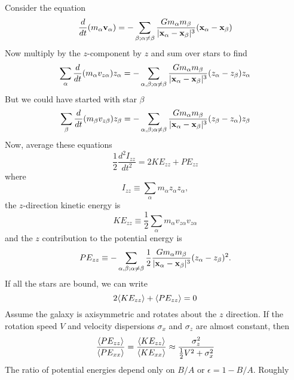 \documentclass[]{article}
\begin{document}
Consider the equation
\begin{equation}
\frac{d}{dt}(m_\alpha \mathbf{v}_\alpha) = - \sum_{\beta; \alpha \ne \beta} \frac{Gm_\alpha m_\beta}{|\mathbf{x}_\alpha - \mathbf{x}_\beta|^3}(\mathbf{x}_\alpha - \mathbf{x}_\beta)
\end{equation}
\noindent
Now multiply by the $z$-component by $z$ and sum over stars to find
\begin{equation}
\sum_{\alpha} \frac{d}{dt}(m_\alpha v_{z\alpha})z_\alpha = - \sum_{\alpha,\beta; \alpha \ne \beta} \frac{Gm_\alpha m_\beta}{|\mathbf{x}_\alpha - \mathbf{x}_\beta|^3}(z_\alpha - z_\beta)z_\alpha
\end{equation}
\noindent
But we could have started with star $\beta$
\begin{equation}
\sum_{\beta} \frac{d}{dt}(m_\beta v_{z\beta})z_\beta = - \sum_{\alpha,\beta; \alpha \ne \beta} \frac{Gm_\alpha m_\beta}{|\mathbf{x}_\alpha - \mathbf{x}_\beta|^3}(z_\beta - z_\alpha)z_\beta
\end{equation}
\noindent
Now, average these equations
\begin{equation}
\frac{1}{2}\frac{d^2 I_{zz}}{dt^2} = 2KE_{zz} + PE_{zz}
\end{equation}
\noindent
where
\begin{equation}
I_{zz} \equiv \sum_{\alpha} m_\alpha z_\alpha z_\alpha,
\end{equation}
\noindent
the $z$-direction kinetic energy is
\begin{equation}
KE_{zz} \equiv \frac{1}{2} \sum_{\alpha} m_{\alpha} v_{z\alpha} v_{z\alpha}
\end{equation}
and the $z$ contribution to the potential energy is
\begin{equation}
PE_{zz} \equiv -\sum_{\alpha,\beta;\alpha\ne\beta}\frac{1}{2} \frac{Gm_\alpha m_\beta}{|\mathbf{x}_\alpha - \mathbf{x}_\beta|^3}(z_\alpha-z_\beta)^2.
\end{equation}
\noindent
If all the stars are bound, we can write
\begin{equation}
2\langle KE_{zz}\rangle + \langle PE_{zz}\rangle = 0
\end{equation}
\noindent
Assume the galaxy is axisymmetric and rotates about the $z$ direction.  If the rotation speed
$V$ and velocity dispersions $\sigma_x$ and $\sigma_z$ are almost constant, then
\begin{equation}
\frac{\langle PE_{zz}\rangle}{\langle PE_{xx}\rangle} = \frac{\langle KE_{zz}\rangle}{\langle KE_{xx}\rangle} \approx \frac{\sigma_z^2}{\frac{1}{2}V^2 + \sigma_x^2}
\end{equation}
\noindent
The ratio of potential energies depend only on $B/A$ or $\epsilon = 1-B/A$.  Roughly
\end{document}
